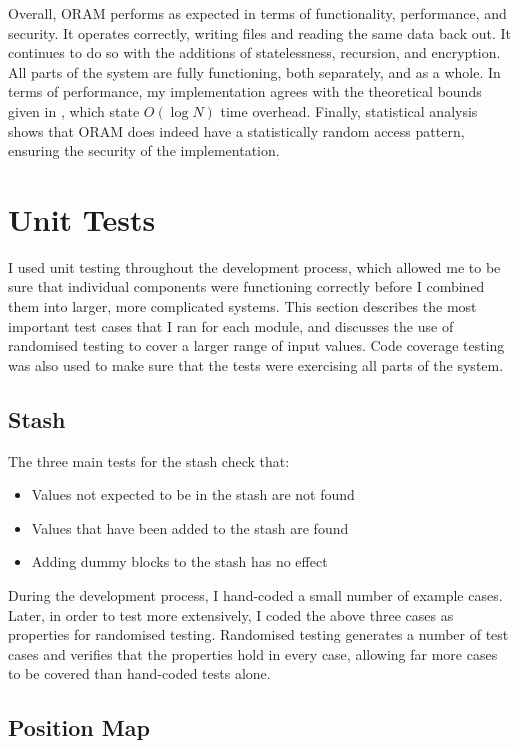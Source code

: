 \documentclass[12pt,a4paper,twoside,openright]{report}
\begin{document}
Overall, ORAM performs as expected in terms of functionality, performance, and security. It operates correctly, writing files and reading the same data back out. It continues to do so with the additions of statelessness, recursion, and encryption. All parts of the system are fully functioning, both separately, and as a whole. In terms of performance, my implementation agrees with the theoretical bounds given in \citet{stefanov2013path}, which state $O(\log N)$ time overhead. Finally, statistical analysis shows that ORAM does indeed have a statistically random access pattern, ensuring the security of the implementation.

\section{Unit Tests}
\label{sec:unitTests}

I used unit testing throughout the development process, which allowed me to be sure that individual components were functioning correctly before I combined them into larger, more complicated systems. This section describes the most important test cases that I ran for each module, and discusses the use of randomised testing to cover a larger range of input values. Code coverage testing was also used to make sure that the tests were exercising all parts of the system.

\subsection{Stash}

The three main tests for the stash check that:

\begin{itemize}
  \item Values not expected to be in the stash are not found
  \item Values that have been added to the stash are found
  \item Adding dummy blocks to the stash has no effect
\end{itemize}

During the development process, I hand-coded a small number of example cases. Later, in order to test more extensively, I coded the above three cases as properties for randomised testing. Randomised testing generates a number of test cases and verifies that the properties hold in every case, allowing far more cases to be covered than hand-coded tests alone.

\subsection{Position Map}
\end{document}
